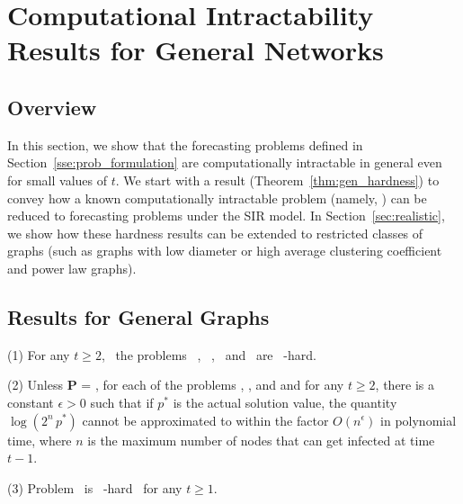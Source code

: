 \section{Computational Intractability Results for 
General Networks}
\label{sec:general_results}



\subsection{Overview}
\label{sse:results_overview}

In this section, we show that the forecasting problems 
defined in Section~\ref{sse:prob_formulation} are computationally
intractable in general even for small values of $t$.
We start with a result (Theorem~\ref{thm:gen_hardness}) 
to convey how a known computationally intractable problem (namely, \mtsat)
can be reduced to forecasting problems under the SIR model.
In Section~\ref{sec:realistic},
we show how these hardness results can be extended 
to restricted classes of graphs 
(such as graphs with low diameter or high average 
clustering coefficient and power law graphs).

\subsection{Results for General Graphs}
\label{sse:gen__results}

\begin{theorem}\label{thm:gen_hardness} \leavevmode
\begin{description}
\item{(1)} For any $t \geq 2$,~ the problems~ \tNewInfs,~ \tTotInfs,~ \tVuls{} 
and~ \tTotVuls{} are~ \cnump-hard. 

\item{(2)}
Unless \textbf{P} = \cnp, 
for each of the problems \tNewInfs, \tTotInfs, \tVuls{} and
\tTotVuls{} and for any $t \geq 2$,
there is a constant $\epsilon > 0$
such that if $p^*$ is the actual solution value,
the quantity $\log{(2^n\,p^*)}$ cannot be approximated to within the factor
$O(n^{\epsilon})$ in polynomial time, where $n$
is the maximum number of nodes that can get infected at time $t-1$. 

\item{(3)} Problem~ \tPeak{} is~ \cnump-hard ~for any $t \geq 1$.
\end{description}
\end{theorem}


